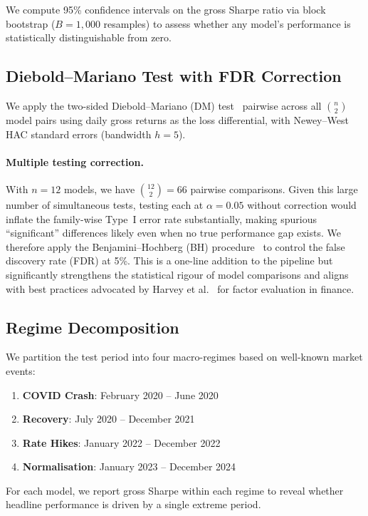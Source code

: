 \documentclass[11pt]{article}
\begin{document}
We compute 95\% confidence intervals on the gross Sharpe ratio via block bootstrap ($B=1{,}000$ resamples) to assess whether any model's performance is statistically distinguishable from zero.

\subsection{Diebold--Mariano Test with FDR Correction}

We apply the two-sided Diebold--Mariano (DM) test~\citep{ref_dm} pairwise across all $\binom{n}{2}$ model pairs using daily gross returns as the loss differential, with Newey--West HAC standard errors (bandwidth $h=5$).

\paragraph{Multiple testing correction.}
With $n=12$ models, we have $\binom{12}{2} = 66$ pairwise comparisons.
Given this large number of simultaneous tests, testing each at $\alpha=0.05$ without correction would inflate the family-wise Type~I error rate substantially, making spurious ``significant'' differences likely even when no true performance gap exists.
We therefore apply the Benjamini--Hochberg (BH) procedure~\citep{ref_bh} to control the false discovery rate (FDR) at 5\%.
This is a one-line addition to the pipeline but significantly strengthens the statistical rigour of model comparisons and aligns with best practices advocated by Harvey et al.~\citep{ref_harvey} for factor evaluation in finance.

\subsection{Regime Decomposition}

We partition the test period into four macro-regimes based on well-known market events:
\begin{enumerate}[leftmargin=1.6em]
  \item \textbf{COVID Crash}: February 2020 -- June 2020
  \item \textbf{Recovery}: July 2020 -- December 2021
  \item \textbf{Rate Hikes}: January 2022 -- December 2022
  \item \textbf{Normalisation}: January 2023 -- December 2024
\end{enumerate}

For each model, we report gross Sharpe within each regime to reveal whether headline performance is driven by a single extreme period.
\end{document}

